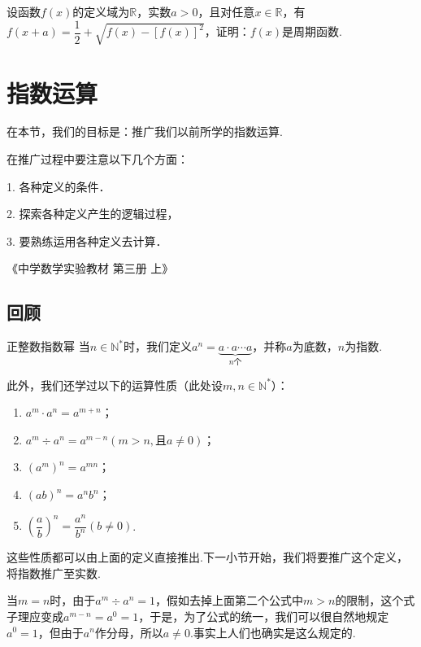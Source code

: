 \documentclass[lang=cn,math=cm,chinesefont=nofont,11pt,scheme=chinese,twocol]{elegantbook}
\begin{document}
\begin{exercise}\label{HS2FZ_lkb1_P55.2}
  设函数$f(x)$的定义域为$\mathbb{R}$，实数$a>0$，且对任意$x\in\mathbb{R}$，有$f(x+a)=\dfrac{1}{2}+\sqrt{f(x)-[f(x)]^{2}}$，证明：$f(x)$是周期函数.
\end{exercise}

\section{指数运算}

在本节，我们的目标是：推广我们以前所学的指数运算.

\epigraph{在推广过程中要注意以下几个方面：

1. 各种定义的条件．

2. 探索各种定义产生的逻辑过程，

3. 要熟练运用各种定义去计算．}{《中学数学实验教材 第三册 上》}

\subsection{回顾}

\begin{definition}{正整数指数幂}
  当$n\in\mathbb{N}^*$时，我们定义$a^n=\underbrace{a\cdot a\cdots a}_{n\text{个}}$，并称$a$为底数，$n$为指数.
\end{definition}

此外，我们还学过以下的运算性质（此处设$m,n\in\mathbb{N}^*$）：

\begin{property}\label{LawOfIndices1}
  \begin{spacing}{1.8}
    \begin{enumerate}
    \item $a^m\cdot a^n=a^{m+n}$；
    \item $a^m\div a^n=a^{m-n}(m>n,\text{且}a\neq 0)$；
    \item $(a^m)^n=a^{mn}$；
    \item $(ab)^n=a^nb^n$；
    \item $\left(\dfrac ab\right)^n=\dfrac{a^n}{b^n}(b\neq 0)$.
    \end{enumerate}  
  \end{spacing}
\end{property}

这些性质都可以由上面的定义直接推出.下一小节开始，我们将要推广这个定义，将指数推广至实数.

当$m=n$时，由于$a^m\div a^n=1$，假如去掉上面第二个公式中$m>n$的限制，这个式子理应变成$a^{m-n}=a^0=1$，于是，为了公式的统一，我们可以很自然地规定$a^0=1$，但由于$a^n$作分母，所以$a\neq 0$.事实上人们也确实是这么规定的.
\end{document}

